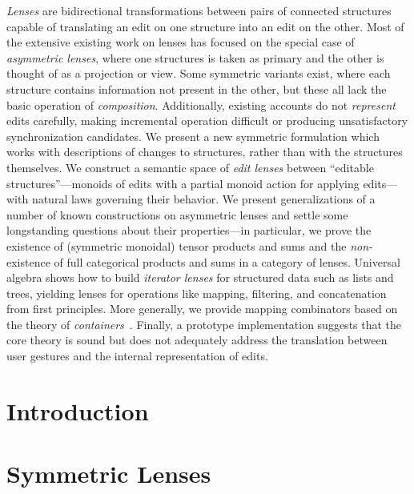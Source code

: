 \documentclass[12pt]{report}
\numberwithin{equation}{section}
\begin{document}
\noindent
{\em Lenses} are bidirectional transformations between pairs of connected
structures capable of translating an edit on one structure into an edit on
the other. Most of the extensive existing work on lenses has focused on the
special case of {\em asymmetric lenses}, where one structures is taken as
primary and the other is thought of as a projection or view. Some symmetric
variants exist, where each structure contains information not present in the
other, but these all lack the basic operation of {\em composition}.
Additionally, existing accounts do not {\em represent} edits carefully,
making incremental operation difficult or producing unsatisfactory
synchronization candidates. We present a new symmetric formulation which
works with descriptions of changes to structures, rather than with the
structures themselves. We construct a semantic space of {\em edit lenses}
between ``editable structures''---monoids of edits with a partial monoid
action for applying edits---with natural laws governing their behavior. We
present generalizations of a number of known constructions on asymmetric
lenses and settle some longstanding questions about their properties---in
particular, we prove the existence of (symmetric monoidal) tensor products
and sums and the {\em non-}existence of full categorical products and sums
in a category of lenses. Universal algebra shows how to build {\em iterator
lenses} for structured data such as lists and trees, yielding lenses for
operations like mapping, filtering, and concatenation from first principles.
More generally, we provide mapping combinators based on the theory of {\em
containers}~\cite{1195941}. Finally, a prototype implementation suggests
that the core theory is sound but does not adequately address the
translation between user gestures and the internal representation of edits.

\newpage

\tableofcontents

\newpage

\listoftables

\listoffigures

\newpage
\singlespacing
{}

\chapter{Introduction}
\label{chap:introduction}
\label{chap:intro}



\chapter{Symmetric Lenses}
\label{chap:complement}
\label{chap:symmetric}
\label{chap:symmetry}
\label{chap:symm}
\end{document}
